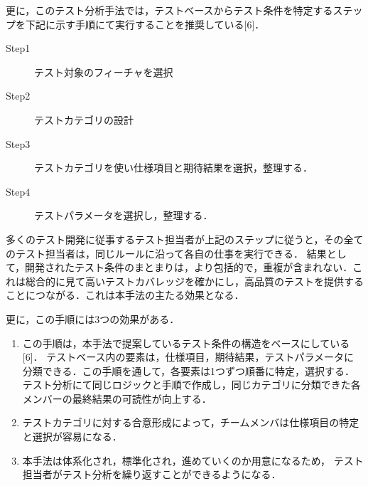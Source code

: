 \documentclass[a4paper,12pt]{jreport}
\begin{document}
更に，このテスト分析手法では，テストベースからテスト条件を特定するステップを下記に示す手順にて実行することを推奨している[6]．

\begin{description}
\item[Step1] テスト対象のフィーチャを選択
\item[Step2] テストカテゴリの設計
\item[Step3] テストカテゴリを使い仕様項目と期待結果を選択，整理する．
\item[Step4] テストパラメータを選択し，整理する．
\end{description}


      多くのテスト開発に従事するテスト担当者が上記のステップに従うと，その全てのテスト担当者は，同じルールに沿って各自の仕事を実行できる． 結果として，開発されたテスト条件のまとまりは，より包括的で，重複が含まれない．これは総合的に見て高いテストカバレッジを確かにし，高品質のテストを提供することにつながる．これは本手法の主たる効果となる．

更に，この手順には3つの効果がある．
\begin{enumerate}
\item この手順は，本手法で提案しているテスト条件の構造をベースにしている [6]． テストベース内の要素は，仕様項目，期待結果，テストパラメータに分類できる．この手順を通して，各要素は1つずつ順番に特定，選択する． テスト分析にて同じロジックと手順で作成し，同じカテゴリに分類できた各メンバーの最終結果の可読性が向上する．
\item テストカテゴリに対する合意形成によって，チームメンバは仕様項目の特定と選択が容易になる．
\item 本手法は体系化され，標準化され，進めていくのか用意になるため， テスト担当者がテスト分析を繰り返すことができるようになる．
\end{enumerate}
\end{document}
